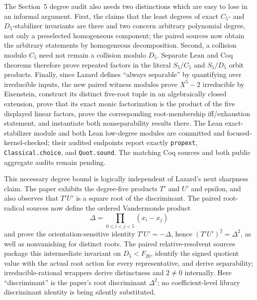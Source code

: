 \documentclass[11pt,a4paper,oneside]{article}
\newcommand{\lean}[1]{\nolinkurl{#1}}
\begin{document}
The Section~5 degree audit also needs two distinctions which are easy to
lose in an informal argument.  First, the claims that the least degrees of
exact $C_5$- and $D_5$-stabilizer invariants are three and two concern
arbitrary polynomial degree, not only a preselected homogeneous component;
the paired sources now obtain the arbitrary statements by homogeneous
decomposition.  Second, a collision modulo $C_5$ need not remain a collision
modulo $D_5$.  Separate Lean and Coq theorems therefore prove repeated
factors in the literal $S_5/C_5$ and $S_5/D_5$ orbit products.  Finally, since
Lazard defines ``always separable'' by quantifying over irreducible inputs,
the new paired witness modules prove $X^5-2$ irreducible by Eisenstein,
construct its distinct five-root tuple in an algebraically closed extension,
prove that its exact monic factorization is the product of the five displayed
linear factors, prove the corresponding root-membership iff/exhaustion
statement, and instantiate both nonseparability results there.  The Lean
exact-stabilizer module and both Lean low-degree modules are committed and
focused-kernel-checked; their audited endpoints report exactly
\lean{propext}, \lean{Classical.choice}, and \lean{Quot.sound}.  The matching
Coq sources and both public aggregate audits remain pending.

This necessary degree bound is logically independent of Lazard's next
sharpness claim.  The paper exhibits the degree-five products $T'$ and $U'$
and epsilon, and also observes that $T'U'$ is a square root of the
discriminant.  The paired root-radical sources now define the ordered
Vandermonde product
\[
  \Delta=\prod_{0\le i<j<5}(x_i-x_j)
\]
and prove the orientation-sensitive identity $T'U'=-\Delta$, hence
$(T'U')^2=\Delta^2$, as well as nonvanishing for distinct roots.  The paired
relative-resolvent sources package this intermediate invariant on
$D_5<F_{20}$, identify the signed quotient value with the actual root action
for every representative, and derive separability; irreducible-rational
wrappers derive distinctness and $2\ne0$ internally.  Here ``discriminant''
is the paper's root discriminant $\Delta^2$; no coefficient-level library
discriminant identity is being silently substituted.
\end{document}

